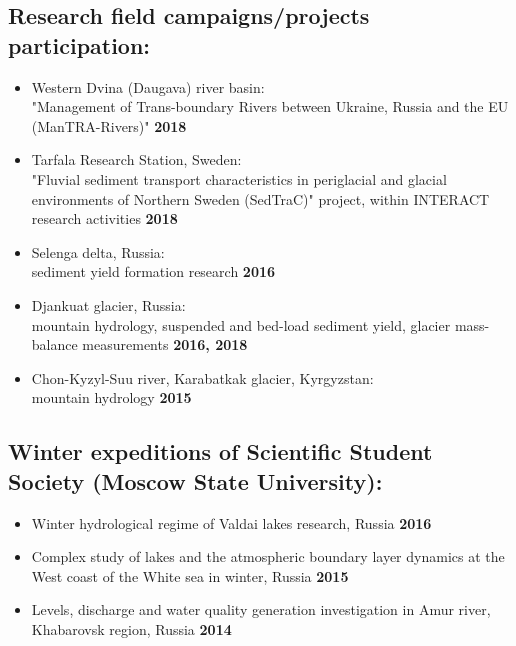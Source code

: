 \documentclass[a4,10pt]{article}
\newenvironment{zitemize}{
\begin{itemize}\itemsep2pt \parskip0pt \parsep1pt}
{\end{itemize}\vspace{-0.5cm}}
\begin{document}
\subsection{Research field campaigns/projects participation:}
    \begin{zitemize}
        \item Western Dvina (Daugava) river basin: \\"Management of Trans-boundary Rivers between Ukraine, Russia and the EU (ManTRA-Rivers)" \hfill \textbf{2018}
        \item Tarfala Research Station, Sweden: \\"Fluvial sediment transport characteristics in periglacial and glacial environments of Northern Sweden (SedTraC)" project, within INTERACT research activities \hfill \textbf{2018}
        \item{Selenga delta, Russia: \\ sediment yield formation research \hfill \textbf{2016}}
        \item{Djankuat glacier, Russia: \\ mountain hydrology, suspended and bed-load sediment yield, glacier mass-balance measurements \hfill \textbf{2016, 2018}}
        \item{Chon-Kyzyl-Suu river, Karabatkak glacier, Kyrgyzstan: \\mountain hydrology \hfill \textbf{2015}}
    \end{zitemize}

\subsection{Winter expeditions of Scientific Student Society (Moscow State University):}
    \begin{zitemize}
        \item Winter hydrological regime of Valdai lakes research, Russia \hfill \textbf{2016}
        \item Complex study of lakes and the atmospheric boundary layer dynamics at the West coast of the White sea in winter, Russia \hfill \textbf{2015}
        \item{Levels, discharge and water quality generation investigation in Amur river, Khabarovsk region, Russia \hfill \textbf{2014}}
    \end{zitemize}


\end{document}
